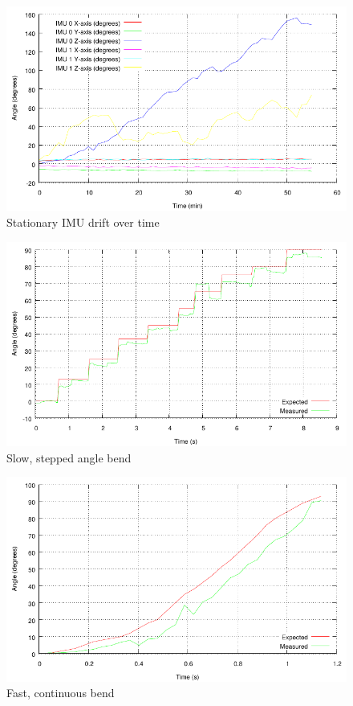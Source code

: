 \documentclass[a4paper, 12pt]{article}
\begin{document}
\begin{figure}[h!]
    \centering
    \includegraphics[scale=1.15]{drift.pdf}
    \caption{Stationary IMU drift over time}
    \label{fig:pic8}
\end{figure}

\begin{figure}[H]
    \centering
    \includegraphics[scale=1.15]{stepped.pdf}
    \caption{Slow, stepped angle bend}
    \label{fig:pic8}
\end{figure}

\begin{figure}[H]
    \centering
    \includegraphics[scale=1.15]{fast_continuous.pdf}
    \caption{Fast, continuous bend}
    \label{fig:pic9}
\end{figure}
\end{document}

